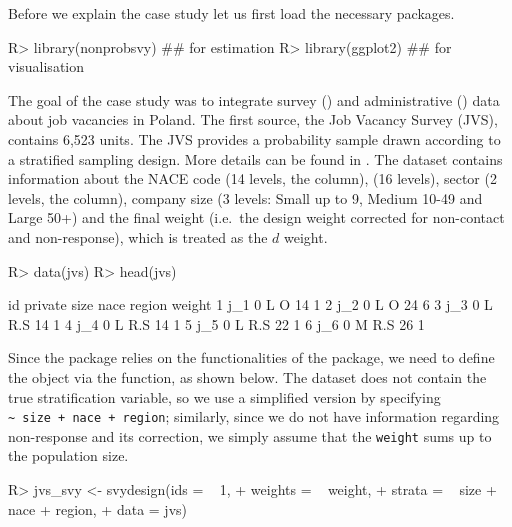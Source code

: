 \documentclass[
]{jss}
\begin{document}
Before we explain the case study let us first load the necessary
packages.

\begin{CodeChunk}
\begin{CodeInput}
R> library(nonprobsvy) ## for estimation
R> library(ggplot2)    ## for visualisation
\end{CodeInput}
\end{CodeChunk}

The goal of the case study was to integrate survey () and
administrative () data about job vacancies in Poland. The
first source, the Job Vacancy Survey (JVS), contains 6,523 units. The
JVS provides a probability sample drawn according to a stratified
sampling design. More details can be found in \cite{jvs2022}. The
dataset contains information about the NACE code (14 levels, the
 column),  (16 levels), sector (2 levels, the
 column), company size (3 levels: Small up to 9, Medium
10-49 and Large 50+) and the final weight (i.e.~the design weight
corrected for non-contact and non-response), which is treated as the
\(d\) weight.

\begin{CodeChunk}
\begin{CodeInput}
R> data(jvs)
R> head(jvs)
\end{CodeInput}
\begin{CodeOutput}
   id private size nace region weight
1 j_1       0    L    O     14      1
2 j_2       0    L    O     24      6
3 j_3       0    L  R.S     14      1
4 j_4       0    L  R.S     14      1
5 j_5       0    L  R.S     22      1
6 j_6       0    M  R.S     26      1
\end{CodeOutput}
\end{CodeChunk}

Since the  package relies on the functionalities of the
 package, we need to define the  object via
the  function, as shown below. The dataset does not
contain the true stratification variable, so we use a simplified version
by specifying \texttt{\textasciitilde{}\ size\ +\ nace\ +\ region};
similarly, since we do not have information regarding non-response and
its correction, we simply assume that the \texttt{weight} sums up to the
population size.

\begin{CodeChunk}
\begin{CodeInput}
R> jvs_svy <- svydesign(ids = ~ 1, 
+                      weights = ~ weight,
+                      strata = ~ size + nace + region,
+                      data = jvs)
\end{CodeInput}
\end{CodeChunk}
\end{document}
